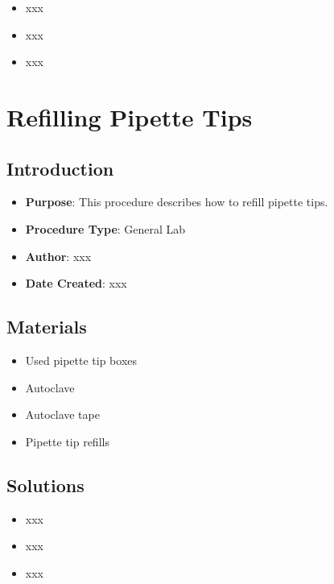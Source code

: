 \documentclass[
  letterpaper,
  DIV=11,
  numbers=noendperiod]{scrreprt}
\providecommand{\tightlist}{%
  \setlength{\itemsep}{0pt}\setlength{\parskip}{0pt}}\usepackage{longtable,booktabs,array}
\begin{document}
\begin{itemize}
\tightlist
\item
  xxx
\item
  xxx
\item
  xxx
\end{itemize}

\hypertarget{sec-general-pipette_tips}{%
\chapter{Refilling Pipette Tips}\label{sec-general-pipette_tips}}

\hypertarget{introduction-8}{%
\section{Introduction}\label{introduction-8}}

\begin{itemize}
\tightlist
\item
  \textbf{Purpose}: This procedure describes how to refill pipette tips.
\item
  \textbf{Procedure Type}: General Lab
\item
  \textbf{Author}: xxx
\item
  \textbf{Date Created}: xxx
\end{itemize}

\hypertarget{materials-8}{%
\section{Materials}\label{materials-8}}

\begin{itemize}
\tightlist
\item
  Used pipette tip boxes
\item
  Autoclave
\item
  Autoclave tape
\item
  Pipette tip refills
\end{itemize}

\hypertarget{solutions-8}{%
\section{Solutions}\label{solutions-8}}

\begin{itemize}
\tightlist
\item
  xxx
\item
  xxx
\item
  xxx
\end{itemize}
\end{document}
